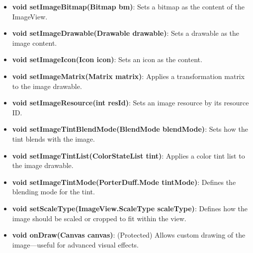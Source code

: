 \documentclass{report}
\begin{document}
\begin{itemize}
\begin{itemize}
        \item \textbf{void setImageBitmap(Bitmap bm)}: Sets a bitmap as the content of the ImageView.
        \item \textbf{void setImageDrawable(Drawable drawable)}: Sets a drawable as the image content.
        \item \textbf{void setImageIcon(Icon icon)}: Sets an icon as the content.
        \item \textbf{void setImageMatrix(Matrix matrix)}: Applies a transformation matrix to the image drawable.
        \item \textbf{void setImageResource(int resId)}: Sets an image resource by its resource ID.
        \item \textbf{void setImageTintBlendMode(BlendMode blendMode)}: Sets how the tint blends with the image.
        \item \textbf{void setImageTintList(ColorStateList tint)}: Applies a color tint list to the image drawable.
        \item \textbf{void setImageTintMode(PorterDuff.Mode tintMode)}: Defines the blending mode for the tint.
        \item \textbf{void setScaleType(ImageView.ScaleType scaleType)}: Defines how the image should be scaled or cropped to fit within the view.
        \item \textbf{void onDraw(Canvas canvas)}: (Protected) Allows custom drawing of the image—useful for advanced visual effects.
    \end{itemize}

    \pagebreak 

\end{itemize}
\end{document}
